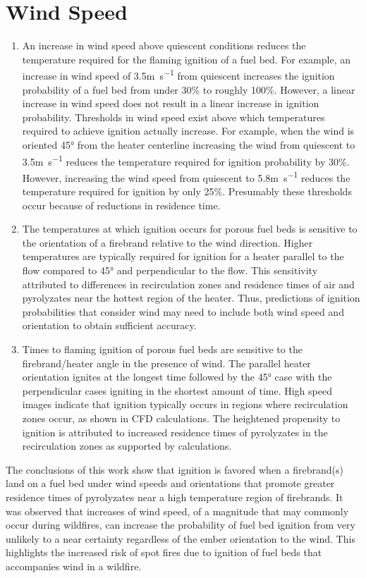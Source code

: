 \section{Wind Speed}
        \begin{enumerate}
            \item
            An increase in wind speed above quiescent conditions reduces the temperature required for the flaming ignition of a fuel bed. For example, an increase in wind speed of 3.5\si{\meter\per\second} from quiescent increases the ignition probability of a fuel bed from under 30\% to roughly 100\%. However, a linear increase in wind speed does not result in a linear increase in ignition probability. Thresholds in wind speed exist above which temperatures required to achieve ignition actually increase. For example, when the wind is oriented 45\si{\degree} from the heater centerline increasing the wind from quiescent to 3.5\si{\meter\per\second} reduces the temperature required for ignition probability by 30\%. However, increasing the wind speed from quiescent to 5.8\si{\meter\per\second} reduces the temperature required for ignition by only 25\%. Presumably these thresholds occur because of reductions in residence time. 
            
            \item The temperatures at which ignition occurs for porous fuel beds is sensitive to the orientation of a firebrand relative to the wind direction. Higher temperatures are typically required for ignition for a heater parallel to the flow compared to 45\si{\degree} and perpendicular to the flow. This sensitivity attributed to differences in recirculation zones and residence times of air and pyrolyzates near the hottest region of the heater. Thus, predictions of ignition probabilities that consider wind may need to include both wind speed and orientation to obtain sufficient accuracy.
            
            \item Times to flaming ignition of porous fuel beds are sensitive to the firebrand/heater angle in the presence of wind.
            The parallel heater orientation ignites at the longest time followed by the 45\si{\degree} case with the perpendicular cases igniting in the shortest amount of time. High speed images indicate that ignition typically occurs in regions where recirculation zones occur, as shown in CFD calculations. The heightened propensity to ignition is attributed to increased residence times of pyrolyzates in the recirculation zones as supported by calculations.
        \end{enumerate}
    The conclusions of this work show that ignition is favored when a firebrand(s) land on a fuel bed under wind speeds and orientations that promote greater residence times of pyrolyzates near a high temperature region of firebrands. It was observed that increases of wind speed, of a magnitude that may commonly occur during wildfires, can increase the probability of fuel bed ignition from very unlikely to a near certainty regardless of the ember orientation to the wind. This highlights the increased risk of spot fires due to ignition of fuel beds that accompanies wind in a wildfire. 


